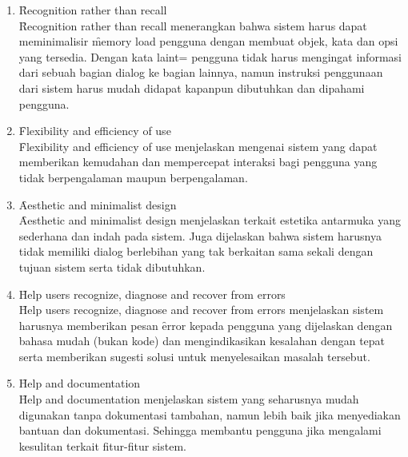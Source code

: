 \begin{enumerate}
	\item \f{Recognition rather than recall}\\
	\f{Recognition rather than recall} menerangkan bahwa sistem harus dapat meminimalisir \f{memory load} pengguna dengan membuat objek, kata dan opsi yang tersedia. Dengan kata laint= pengguna tidak harus mengingat informasi dari sebuah bagian dialog ke bagian lainnya, namun instruksi penggunaan dari sistem harus mudah didapat kapanpun dibutuhkan dan dipahami pengguna.
	\item \f{Flexibility and efficiency of use}\\
	\f{Flexibility and efficiency of use} menjelaskan mengenai sistem yang dapat memberikan kemudahan dan mempercepat interaksi bagi pengguna yang tidak berpengalaman maupun berpengalaman.
	\item \f{Aesthetic and minimalist design}\\
	\f{Aesthetic and minimalist design} menjelaskan terkait estetika antarmuka yang sederhana dan indah pada sistem. Juga dijelaskan bahwa sistem harusnya tidak memiliki dialog berlebihan yang tak berkaitan sama sekali dengan tujuan sistem serta tidak dibutuhkan. 
	\item \f{Help users recognize, diagnose and recover from errors}\\
	\f{Help users recognize, diagnose and recover from errors} menjelaskan sistem harusnya memberikan pesan \f{error} kepada pengguna yang dijelaskan dengan bahasa mudah (bukan kode) dan mengindikasikan kesalahan dengan tepat serta memberikan sugesti solusi untuk menyelesaikan masalah tersebut.
	\item \f{Help and documentation}\\
	\f{Help and documentation} menjelaskan sistem yang seharusnya mudah digunakan tanpa dokumentasi tambahan, namun lebih baik jika menyediakan bantuan dan dokumentasi. Sehingga membantu pengguna jika mengalami kesulitan terkait fitur-fitur sistem.
\end{enumerate}
